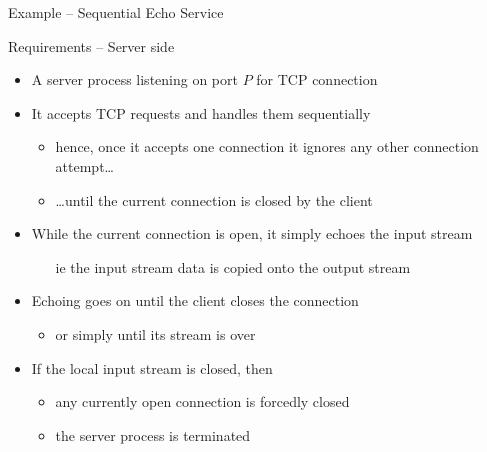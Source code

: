 \documentclass[presentation]{beamer}\mode<presentation>{\usetheme{AMSBolognaFC}}
\begin{document}
\begin{frame}[c,allowframebreaks]{Example -- Sequential Echo Service}

    \begin{block}{Requirements -- Server side}
        \begin{itemize}
            \item A server process listening on port $P$ for TCP connection
            \item It accepts TCP requests and handles them \alert{sequentially}
            \begin{itemize}
                \item hence, once it accepts one connection it ignores any other connection attempt\ldots
                \item \ldots until the current connection is closed by the client
            \end{itemize}
            \item While the current connection is open, it simply echoes the input stream
            \begin{itemize}
                \item[ie] the input stream data is copied onto the output stream
            \end{itemize}
            \item Echoing goes on until the client closes the connection
            \begin{itemize}
                \item or simply until its stream is over
            \end{itemize}
            \item If the local input stream is closed, then
            \begin{itemize}
                \item any currently open connection is forcedly closed
                \item the server process is terminated
            \end{itemize}
        \end{itemize}
    \end{block}


\end{frame}
\end{document}
